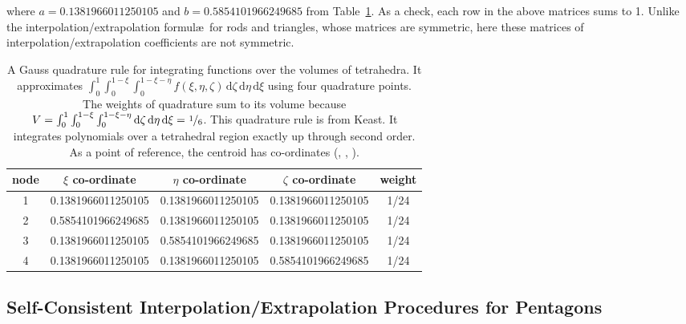 where $a = 0.1381966011250105$ and $b = 0.5854101966249685$ from Table~\ref{tab:4nodedTet}.  As a check, each row in the above matrices sums to 1.  Unlike the interpolation\slash extrapolation formul\ae\ for rods and triangles, whose matrices are symmetric, here these matrices of interpolation\slash extrapolation coefficients are not symmetric. 
    
\begin{table}
    \hspace{-7mm}
    \begin{tabular}{|c|cccc|}
        \hline
        node & $\xi$ co-ordinate & $\eta$ co-ordinate & 
        $\zeta$ co-ordinate & weight \\ \hline        
        1 & 0.1381966011250105 & 0.1381966011250105 & 0.1381966011250105 & 1/24 \\
        2 & 0.5854101966249685 & 0.1381966011250105 & 0.1381966011250105 & 1/24 \\
        3 & 0.1381966011250105 & 0.5854101966249685 & 0.1381966011250105 & 1/24 \\
        4 & 0.1381966011250105 & 0.1381966011250105 & 0.5854101966249685 & 1/24 \\
        \hline
    \end{tabular}
    \caption{A Gauss quadrature rule for integrating functions over the volumes of tetrahedra.  It approximates $\int_0^1 \int_0^{1-\xi} \int_0^{1-\xi-\eta} f(\xi, \eta, \zeta) \, \mathrm{d}\zeta \, \mathrm{d}\eta \, \mathrm{d}\xi$ using four quadrature points.  The weights of quadrature sum to its volume because $V = \int_0^1 \int_0^{1-\xi} \int_0^{1-\xi-\eta} \mathrm{d}\zeta \, \mathrm{d}\eta \, \mathrm{d}\xi = \textfrac{1}{6}$.  This quadrature rule is from Keast.  It integrates polynomials over a tetrahedral region exactly up through second order.  As a point of reference, the centroid has co-ordinates (, , ).}
    \label{tab:4nodedTet}
\end{table}

\subsection{Self-Consistent Interpolation\slash Extrapolation Procedures for Pentagons}

